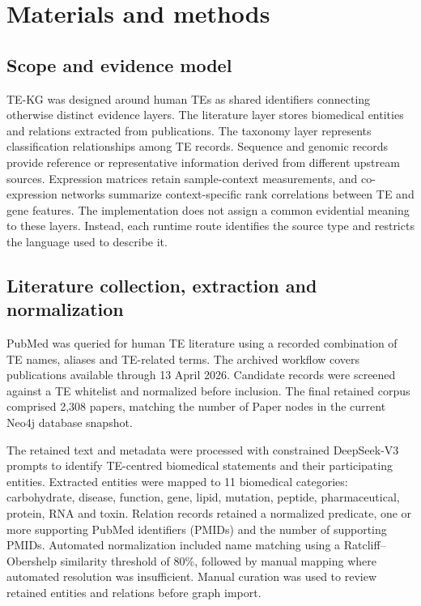\section{Materials and methods}

\subsection{Scope and evidence model}

TE-KG was designed around human TEs as shared identifiers connecting otherwise distinct evidence layers. The literature layer stores biomedical entities and relations extracted from publications. The taxonomy layer represents classification relationships among TE records. Sequence and genomic records provide reference or representative information derived from different upstream sources. Expression matrices retain sample-context measurements, and co-expression networks summarize context-specific rank correlations between TE and gene features. The implementation does not assign a common evidential meaning to these layers. Instead, each runtime route identifies the source type and restricts the language used to describe it.

\subsection{Literature collection, extraction and normalization}

PubMed was queried for human TE literature using a recorded combination of TE names, aliases and TE-related terms. The archived workflow covers publications available through 13 April 2026. Candidate records were screened against a TE whitelist and normalized before inclusion. The final retained corpus comprised 2,308 papers, matching the number of Paper nodes in the current Neo4j database snapshot.

The retained text and metadata were processed with constrained DeepSeek-V3 prompts to identify TE-centred biomedical statements and their participating entities. Extracted entities were mapped to 11 biomedical categories: carbohydrate, disease, function, gene, lipid, mutation, peptide, pharmaceutical, protein, RNA and toxin. Relation records retained a normalized predicate, one or more supporting PubMed identifiers (PMIDs) and the number of supporting PMIDs. Automated normalization included name matching using a Ratcliff--Obershelp similarity threshold of 80\%, followed by manual mapping where automated resolution was insufficient. Manual curation was used to review retained entities and relations before graph import.

